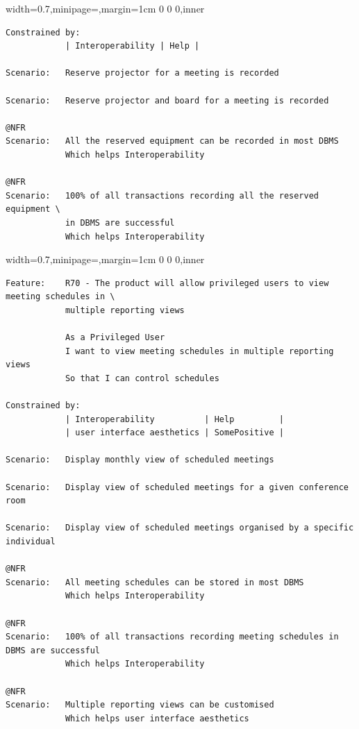 \documentclass[dissertation,final]{softeng}
\newenvironment{featurecode}[1]
{ \lrbox\featurebox \begin{adjustbox}{width=#1\textwidth,minipage=\textwidth,margin=1cm 0 0 0,inner} }
{ \end{adjustbox}\endlrbox}
\newenvironment{featurelist}[2]
{
\newcommand{\setcaption}{\caption{#1}}
\newcommand{\setlabel}{\label{#2}}
}
{\begin{listing}[h!]\centering\usebox\featurebox\setcaption\setlabel\end{listing}}
\begin{document}
\begin{appendices}
\begin{featurelist}{R68 -- The product shall record all the equipment that has been reserved}{lst:feature_r68}
\begin{featurecode}{0.7}
\begin{verbatim}
Constrained by:
            | Interoperability | Help |

Scenario:   Reserve projector for a meeting is recorded

Scenario:   Reserve projector and board for a meeting is recorded	

@NFR	
Scenario:   All the reserved equipment can be recorded in most DBMS
            Which helps Interoperability

@NFR	
Scenario:   100% of all transactions recording all the reserved equipment \
            in DBMS are successful
            Which helps Interoperability
\end{verbatim}
\end{featurecode}
\end{featurelist}

\begin{featurelist}{R70 -- The product will allow privileged users to view meeting schedules}{lst:feature_r70}
\begin{featurecode}{0.7}
\begin{verbatim}
Feature:    R70 - The product will allow privileged users to view meeting schedules in \ 
            multiple reporting views

            As a Privileged User
            I want to view meeting schedules in multiple reporting views
            So that I can control schedules
	
Constrained by:
            | Interoperability          | Help         |
            | user interface aesthetics | SomePositive |

Scenario:   Display monthly view of scheduled meetings

Scenario:   Display view of scheduled meetings for a given conference room

Scenario:   Display view of scheduled meetings organised by a specific individual
	
@NFR	
Scenario:   All meeting schedules can be stored in most DBMS
            Which helps Interoperability

@NFR
Scenario:   100% of all transactions recording meeting schedules in DBMS are successful
            Which helps Interoperability

@NFR
Scenario:   Multiple reporting views can be customised
            Which helps user interface aesthetics
\end{verbatim}
\end{featurecode}
\end{featurelist}
\clearpage


\end{appendices}
\end{document}
